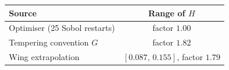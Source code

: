 \begin{tabular}{lc}
\toprule
Source & Range of $H$\\
\midrule
Optimiser (25 Sobol restarts) & factor $1.00$\\
Tempering convention $G$ & factor $1.82$\\
Wing extrapolation & $[0.087,\,0.155]$, factor $1.79$\\
\bottomrule
\end{tabular}
